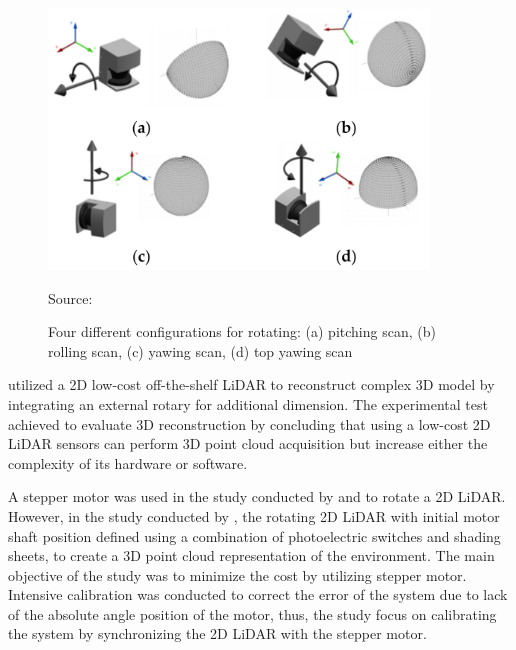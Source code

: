 \begin{figure}[H]
	\centering
	\includegraphics[width=0.9\textwidth]{Figures/tilting} %
	\caption{Four different configurations for rotating: (a) pitching scan, (b) rolling scan, (c) yawing scan, (d) top yawing scan}
	\label{fig:four_different_configurations}
	\medskip
	\normalsize Source: \citep{raj2020}
\end{figure}


\citet{kang2018} utilized a 2D low-cost off-the-shelf LiDAR to reconstruct complex 3D model by integrating an external rotary for additional dimension. The experimental test achieved to evaluate 3D reconstruction by concluding that using a low-cost 2D LiDAR sensors can  perform 3D point cloud acquisition but increase either the complexity of its hardware or software.

A stepper motor was used in the study conducted by \citet{yuan2021} and \citet{kang2018} to rotate a 2D LiDAR. However, in the study conducted by \citet{yuan2021}, the rotating 2D LiDAR with initial motor shaft position defined using a combination of photoelectric switches and shading sheets, to create a 3D point cloud representation of the environment. The main objective of the study was to minimize the cost by utilizing stepper motor. Intensive calibration was conducted to correct the error of the system due to lack of the absolute angle position of the motor, thus, the study focus on calibrating the system by synchronizing the 2D LiDAR with the stepper motor.

